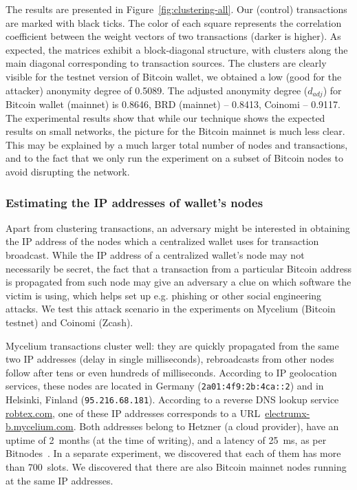 The results are presented in Figure~\ref{fig:clustering-all}.
Our (control) transactions are marked with black ticks.
The color of each square represents the correlation coefficient between the weight vectors of two transactions (darker is higher).
As expected, the matrices exhibit a block-diagonal structure, with clusters along the main diagonal corresponding to transaction sources.
The clusters are clearly visible for the testnet version of Bitcoin wallet, we obtained a low (good for the attacker) anonymity degree of 0.5089.
The adjusted anonymity degree ($d_{adj}$) for Bitcoin wallet (mainnet) is 0.8646, BRD (mainnet) -- 0.8413, Coinomi -- 0.9117.
The experimental results show that while our technique shows the expected results on small networks, the picture for the Bitcoin mainnet is much less clear.
This may be explained by a much larger total number of nodes and transactions, and to the fact that we only run the experiment on a subset of Bitcoin nodes to avoid disrupting the network.

\subsubsection{Estimating the IP addresses of wallet's nodes}

Apart from clustering transactions, an adversary might be interested in obtaining the IP address of the nodes which a centralized wallet uses for transaction broadcast.
While the IP address of a centralized wallet's node may not necessarily be secret, the fact that a transaction from a particular Bitcoin address is propagated from such node may give an adversary a clue on which software the victim is using, which helps set up e.g. phishing or other social engineering attacks.
We test this attack scenario in the experiments on Mycelium (Bitcoin testnet) and Coinomi (Zcash).

Mycelium transactions cluster well: they are quickly propagated from the same two IP addresses (delay in single milliseconds), rebroadcasts from other nodes follow after tens or even hundreds of milliseconds.
According to IP geolocation services, these nodes are located in Germany (\texttt{2a01:4f9:2b:4ca::2}) and in Helsinki, Finland (\texttt{95.216.68.181}).
According to a reverse DNS lookup service \url{robtex.com}, one of these IP addresses corresponds to a URL~\url{electrumx-b.mycelium.com}.
Both addresses belong to Hetzner (a cloud provider), have an uptime of 2~months (at the time of writing), and a latency of 25~ms, as per Bitnodes~\cite{Bitnodes}.
In a separate experiment, we discovered that each of them has more than 700~slots.
We discovered that there are also Bitcoin mainnet nodes running at the same IP addresses.


